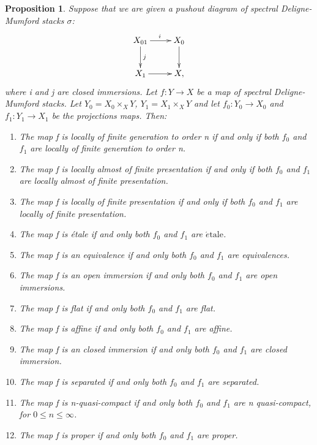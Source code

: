 \documentclass[12pt]{article}
\newtheorem{proposition}[theorem]{Proposition}
\theoremstyle{thry}
\def  \etale    {\acute{e}\text{tale}}
\begin{document}
\begin{proposition}\cite[Proposition 16.3.2.1]{lu-SAG} \label{Deformation of Stack}
	Suppose that we are given a pushout diagram of spectral Deligne-Mumford stacks $\sigma$:
	$$
	\xymatrix{
		X_{01} \ar[r]^{i}  \ar[d]^{j}  &  X_0 \ar[d] \\
    	X_1 \ar[r]  &  X,   \\
    }
	$$
	where i and j are closed immersions. Let $f: Y\to X$ be a map of spectral Deligne-Mumford stacks. Let $Y_0= X_0 \times_X Y$, $Y_1 = X_1 \times_X Y$ and let $f_0:Y_0  \to X_0$ and $f_1: Y_1 \to X_1$ be the projections maps. Then: 
	\begin{enumerate}
		\item The map f is locally of finite generation to order n if and only if both $f_0$ and $f_1$ are locally of finite generation to order n.
		\item The map f is locally almost of finite presentation if and only if both $f_0$ and $f_1$ are locally  almost of finite presentation.
		\item The map f is locally of finite presentation if and only if both $f_0$ and $f_1$ are locally of finite presentation.
		\item  The map f is \'etale  if and only both $f_0$ and $f_1$ are $\etale$.
		\item  The map f is  an equivalence  if and only both $f_0$ and $f_1$ are equivalences.
		\item  The map f is an open immersion  if and only both $f_0$ and $f_1$ are open immersions.
		\item  The map f is flat  if and only both $f_0$ and $f_1$ are flat.
		\item  The map f is affine  if and only both $f_0$ and $f_1$ are affine.
        \item  The map f is an closed immersion  if and only both $f_0$ and $f_1$ are closed immersion.
        \item   The map f is separated  if and only both $f_0$ and $f_1$ are separated.
        \item  The map f is n-quasi-compact  if and only both $f_0$ and $f_1$ are n quasi-compact, for $0 \leq n \leq \infty$.
        \item    The map f is proper  if and only both $f_0$ and $f_1$ are proper.
	\end{enumerate}
\end{proposition}
\end{document}
